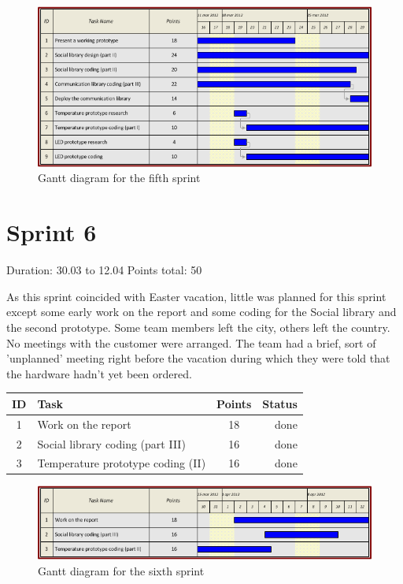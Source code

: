 \begin{figure}[h!]
\centering \includegraphics[scale=0.8]{img/sprints-gantt5.png}
\caption{Gantt diagram for the fifth sprint}
\label{fig:sprints-gantt5}
\end{figure}


\newpage

\section{Sprint 6}

Duration: 30.03 to 12.04
Points total: 50

As this sprint coincided with Easter vacation, little was planned for this sprint
except some early work on the report and some coding for the Social library and the second prototype.
Some team members left the city, others left the country. No meetings with the customer were arranged.
The team had a brief, sort of 'unplanned' meeting right before the vacation during which they
were told that the hardware hadn't yet been ordered.

\begin{table}[ht!]
\begin{tabular}{ | c | l | c | r | }

\hline
\textbf{ID} & \textbf{Task} & \textbf{Points} & \textbf{Status} \\
\hline

1 & Work on the report					& 18 & done \\
\hline
2 & Social library coding (part III)	& 16 & done \\
\hline
3 & Temperature prototype coding (II)	& 16 & done \\
\hline

\end{tabular}
\end{table}

\begin{figure}[h!]
\centering \includegraphics[scale=0.8]{img/sprints-gantt6.png}
\caption{Gantt diagram for the sixth sprint}
\label{fig:sprints-gantt6}
\end{figure}

